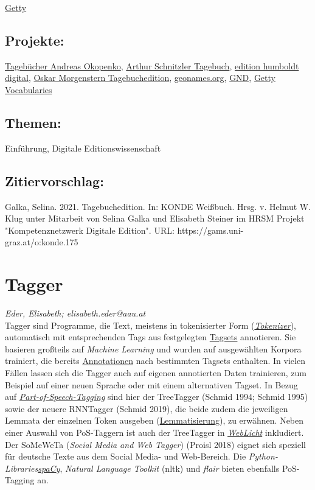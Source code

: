 \documentclass{article}
\begin{document}
\href{https://gams.uni-graz.at/o:konde.108}{Getty}\subsection*{Projekte:}\href{https://edition.onb.ac.at/okopenko/context:okopenko/methods/sdef:Context/get}{Tagebücher Andreas Okopenko}, \href{https://schnitzler-tagebuch.acdh.oeaw.ac.at/pages/index.html}{Arthur Schnitzler Tagebuch}, \href{https://edition-humboldt.de}{edition humboldt digital}, \href{http://gams.uni-graz.at/context:ome}{Oskar Morgenstern Tagebuchedition}, \href{http://www.geonames.org}{geonames.org}, \href{https://www.dnb.de/DE/Professionell/Standardisierung/GND/gnd.html}{GND}, \href{https://www.getty.edu/research/tools/vocabularies/}{Getty Vocabularies}\subsection*{Themen:}Einführung, Digitale Editionswissenschaft\subsection*{Zitiervorschlag:}Galka, Selina. 2021. Tagebuchedition. In: KONDE Weißbuch. Hrsg. v. Helmut W. Klug unter Mitarbeit von Selina Galka und Elisabeth Steiner im HRSM Projekt "Kompetenznetzwerk Digitale Edition". URL: https://gams.uni-graz.at/o:konde.175\newpage\section*{Tagger} \emph{Eder, Elisabeth; elisabeth.eder@aau.at }\\
        
    Tagger sind Programme, die Text, meistens in tokenisierter Form (\emph{\href{http://gams.uni-graz.at/o:konde.216}{Tokenizer}}), automatisch mit entsprechenden Tags aus festgelegten \href{http://gams.uni-graz.at/o:konde.177}{Tagsets} annotieren. Sie basieren großteils auf \emph{Machine Learning} und wurden auf ausgewählten Korpora trainiert, die bereits \href{http://gams.uni-graz.at/o:konde.17}{Annotationen} nach bestimmten Tagsets enthalten. In vielen Fällen lassen sich die Tagger auch auf eigenen annotierten Daten trainieren, zum Beispiel auf einer neuen Sprache oder mit einem alternativen Tagset. In Bezug auf \emph{\href{http://gams.uni-graz.at/o:konde.156}{Part-of-Speech-Tagging}} sind hier der TreeTagger (Schmid 1994; Schmid 1995) sowie der neuere RNNTagger (Schmid 2019), die beide zudem die jeweiligen Lemmata der einzelnen Token ausgeben (\href{http://gams.uni-graz.at/o:konde.115}{Lemmatisierung}), zu erwähnen. Neben einer Auswahl von PoS-Taggern ist auch der TreeTagger in \emph{\href{http://gams.uni-graz.at/o:konde.212}{WebLicht}} inkludiert. Der SoMeWeTa (\emph{Social Media and Web Tagger}) (Proisl 2018) eignet sich speziell für deutsche Texte aus dem Social Media- und Web-Bereich. Die \emph{Python-Libraries}\emph{\href{http://gams.uni-graz.at/o:konde.170}{spaCy}}, \emph{Natural Language Toolkit} (nltk) und \emph{flair} bieten ebenfalls PoS-Tagging an.\\
            
\end{document}
